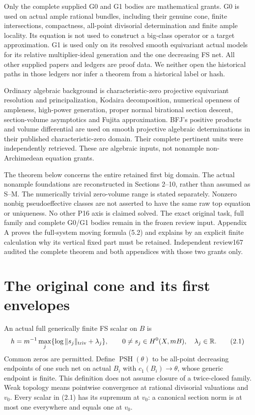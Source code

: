 \documentclass[10pt]{article}
\newcommand{\PSH}{\operatorname{PSH}}
\begin{document}
Only the complete supplied G0 and G1 bodies are mathematical grants.
G0 is used on actual ample rational bundles, including their genuine cone,
finite intersections, compactness, all-point divisorial determination and
finite ample locality. Its equation is not used to construct a big-class
operator or a target approximation. G1 is used only on its resolved smooth
equivariant actual models for its relative multiplier-ideal generation and
the one decreasing FS net. All other supplied papers and ledgers are proof
data. We neither open the historical paths in those ledgers nor infer a
theorem from a historical label or hash.

Ordinary algebraic background is characteristic-zero projective equivariant
resolution and principalization, Kodaira decomposition, numerical openness
of ampleness, high-power generation, proper normal birational section
descent, section-volume asymptotics and Fujita approximation. BFJ's
positive products and volume differential are used on smooth projective
algebraic determinations in their published characteristic-zero domain.
Their complete pertinent units were independently retrieved. These are
algebraic inputs, not nonample non-Archimedean equation grants.

The theorem below concerns the entire retained first big domain.
The actual nonample foundations are reconstructed in Sections 2--10,
rather than assumed as S--M. The numerically trivial zero-volume
range is stated separately. Nonzero nonbig pseudoeffective classes
are not asserted to have the same raw top equation or uniqueness.
No other P16 axis is claimed solved. The exact original task, full family and complete G0/G1 bodies remain
in the frozen review input. Appendix A proves the full-system moving
formula (5.2) and explains by an explicit finite calculation why its
vertical fixed part must be retained. Independent review167 audited
the complete theorem and both appendices with those two grants only.

\section{The original cone and its first envelopes}
An actual full generically finite FS scalar on $B$ is
\[
 h=m^{-1}\max_j\{\log\|s_j\|_{\rm triv}+\lambda_j\},
 \qquad 0\ne s_j\in H^0(X,mB),\quad\lambda_j\in\mathbb R.
 \tag{2.1}
\]
Common zeros are permitted. Define $\PSH(\theta)$ to be all-point
decreasing endpoints of one such net on actual $B_i$ with
$c_1(B_i)\to\theta$, whose generic endpoint is finite. This definition
does not assume closure of a twice-closed family. Weak topology means
pointwise convergence at rational divisorial valuations and $v_0$.
Every scalar in (2.1) has its supremum at $v_0$: a canonical section norm
is at most one everywhere and equals one at $v_0$.
\end{document}
